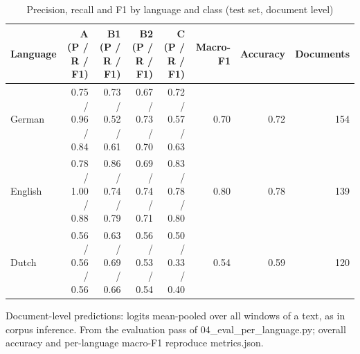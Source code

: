 \begin{table}[htbp]
\centering
\scriptsize\setlength{\tabcolsep}{3pt}
\begin{threeparttable}
\caption{Precision, recall and F1 by language and class (test set, document level)}
\label{tab:clf-prf-doc}
\begin{tabular}{lrrrrrrr}
\hline
Language & A (P / R / F1) & B1 (P / R / F1) & B2 (P / R / F1) & C (P / R / F1) & Macro-F1 & Accuracy & Documents \\
\hline
German & 0.75 / 0.96 / 0.84 & 0.73 / 0.52 / 0.61 & 0.67 / 0.73 / 0.70 & 0.72 / 0.57 / 0.63 & 0.70 & 0.72 & 154 \\
English & 0.78 / 1.00 / 0.88 & 0.86 / 0.74 / 0.79 & 0.69 / 0.74 / 0.71 & 0.83 / 0.78 / 0.80 & 0.80 & 0.78 & 139 \\
Dutch & 0.56 / 0.56 / 0.56 & 0.63 / 0.69 / 0.66 & 0.56 / 0.53 / 0.54 & 0.50 / 0.33 / 0.40 & 0.54 & 0.59 & 120 \\
\hline
\end{tabular}
\begin{tablenotes}
\footnotesize
\item Document-level predictions: logits mean-pooled over all windows of a text, as in corpus inference. From the evaluation pass of 04\_eval\_per\_language.py; overall accuracy and per-language macro-F1 reproduce metrics.json.
\end{tablenotes}
\end{threeparttable}
\end{table}
